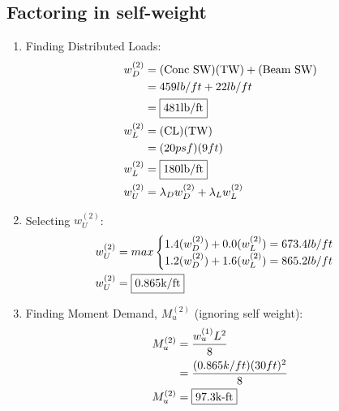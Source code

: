 \documentclass{report} %
\begin{document}
\subsection*{Factoring in self-weight}
\begin{enumerate}
    \item Finding Distributed Loads:
        \begin{equation*}
            \begin{aligned}
                w^{(2)}_D   &= (\text{Conc SW}) (\text{TW}) + (\text{Beam SW}) \\
                            &= 459lb/ft + 22lb/ft \\
                            &= \framebox{481lb/ft} \\
                w^{(2)}_L &= (\text{CL}) (\text{TW}) \\
                            &= (20psf)(9ft) \\
                w^{(2)}_L &= \framebox{180lb/ft} \\
                w^{(2)}_U   &= \lambda _D w^{(2)}_D + \lambda _L w^{(2)}_L \\
            \end{aligned}
        \end{equation*}
    \item Selecting $w^{(2)}_U$:
    \begin{equation*}
        \begin{aligned}
            w^{(2)}_U &= max
                \begin{cases}
                    1.4(w^{(2)}_D) + 0.0(w^{(2)}_L) = 673.4lb/ft \\
                    1.2(w^{(2)}_D) + 1.6(w^{(2)}_L) = 865.2lb/ft \\
                \end{cases} \\
            w^{(2)}_U &= \framebox{0.865k/ft}
        \end{aligned}
    \end{equation*}
    \item Finding Moment Demand, $M^{(2)}_u$ (ignoring self weight):
        \begin{equation*}
            \begin{aligned}
                M^{(2)}_u   &= \frac{{w^{(1)}_u}L^2}{8} \\
                            &= \frac{(0.865k/ft)(30ft)^2}{8} \\
                M^{(2)}_u   &= \framebox{97.3k-ft}
            \end{aligned}

\end{equation*}
\end{enumerate}
\end{document}
